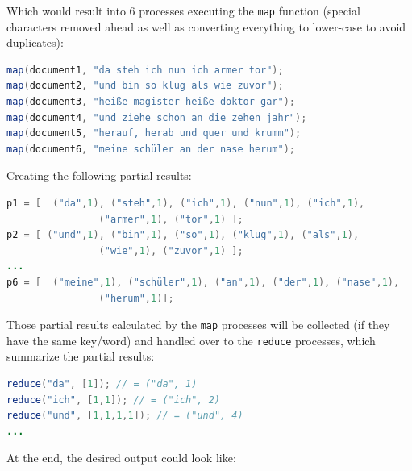 {Which would result into 6 processes executing the \lstinline{map} function (special characters removed ahead as well as converting everything to lower-case to avoid duplicates):\\

\begin{lstlisting}[aboveskip=1ex, belowskip=3ex, xleftmargin=18pt, emphstyle=\underbar, breaklines=true, showstringspaces=false, captionpos=b, caption=MR Example - \textit{Word Count (\lstinline{map()} Calls)}, label=min_mapreduce_documents,language=java]
map(document1, "da steh ich nun ich armer tor");
map(document2, "und bin so klug als wie zuvor");
map(document3, "heiße magister heiße doktor gar");
map(document4, "und ziehe schon an die zehen jahr");
map(document5, "herauf, herab und quer und krumm");
map(document6, "meine schüler an der nase herum");
\end{lstlisting}

Creating the following partial results:\\

\begin{lstlisting}[aboveskip=1ex, belowskip=3ex, xleftmargin=18pt, emphstyle=\underbar, breaklines=true, showstringspaces=false, captionpos=b, caption=MR Example - \textit{Word Count (Partial \lstinline{map()} Results)}, label=min_mapreduce_documents,language=java]
p1 = [	("da",1), ("steh",1), ("ich",1), ("nun",1), ("ich",1), 
				("armer",1), ("tor",1) ];
p2 = [ ("und",1), ("bin",1), ("so",1), ("klug",1), ("als",1), 
				("wie",1), ("zuvor",1) ];
...
p6 = [	("meine",1), ("schüler",1), ("an",1), ("der",1), ("nase",1), 
				("herum",1)];
\end{lstlisting}

Those partial results calculated by the \lstinline{map} processes will be collected (if they have the same key/word) and handled over to the \lstinline{reduce} processes, which summarize the partial results:\\

\begin{lstlisting}[aboveskip=1ex, belowskip=3ex, xleftmargin=18pt, emphstyle=\underbar, breaklines=true, showstringspaces=false, captionpos=b, caption=MR Example - \textit{Word Count (\lstinline{reduce()} Calls)}, label=min_mapreduce_documents,language=java]
reduce("da", [1]); // = ("da", 1)
reduce("ich", [1,1]); // = ("ich", 2)
reduce("und", [1,1,1,1]); // = ("und", 4)
...
\end{lstlisting}

At the end, the desired output could look like:\\

}
